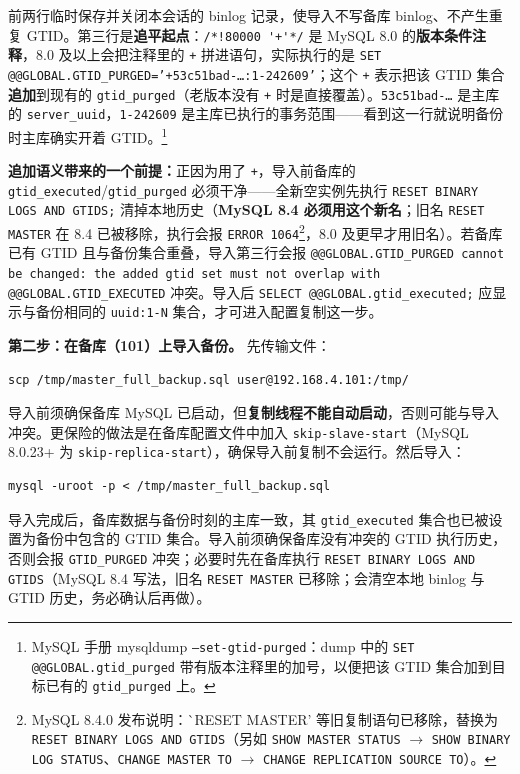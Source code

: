 \documentclass[12pt,UTF8]{ctexbook}
\begin{document}
前两行临时保存并关闭本会话的 binlog 记录，使导入不写备库 binlog、不产生重复 GTID。第三行是\textbf{追平起点}：\verb|/*!80000 '+'*/| 是 MySQL 8.0 的\textbf{版本条件注释}，8.0 及以上会把注释里的 \texttt{+} 拼进语句，实际执行的是 \texttt{SET @@GLOBAL.GTID\_PURGED='+53c51bad-\ldots:1-242609'}；这个 \texttt{+} 表示把该 GTID 集合\textbf{追加}到现有的 \texttt{gtid\_purged}（老版本没有 \texttt{+} 时是直接覆盖）。\texttt{53c51bad-\ldots} 是主库的 \texttt{server\_uuid}，\texttt{1-242609} 是主库已执行的事务范围——看到这一行就说明备份时主库确实开着 GTID。\footnote{MySQL 手册 mysqldump \texttt{--set-gtid-purged}：dump 中的 \texttt{SET @@GLOBAL.gtid\_purged} 带有版本注释里的加号，以便把该 GTID 集合加到目标已有的 \texttt{gtid\_purged} 上。}

\textbf{追加语义带来的一个前提：}正因为用了 \texttt{+}，导入前备库的 \texttt{gtid\_executed}/\texttt{gtid\_purged} 必须干净——全新空实例先执行 \texttt{RESET BINARY LOGS AND GTIDS;} 清掉本地历史（\textbf{MySQL 8.4 必须用这个新名}；旧名 \texttt{RESET MASTER} 在 8.4 已被移除，执行会报 \texttt{ERROR 1064}\footnote{MySQL 8.4.0 发布说明：\`{}RESET MASTER' 等旧复制语句已移除，替换为 \texttt{RESET BINARY LOGS AND GTIDS}（另如 \texttt{SHOW MASTER STATUS} $\to$ \texttt{SHOW BINARY LOG STATUS}、\texttt{CHANGE MASTER TO} $\to$ \texttt{CHANGE REPLICATION SOURCE TO}）。}，8.0 及更早才用旧名）。若备库已有 GTID 且与备份集合重叠，导入第三行会报 \texttt{@@GLOBAL.GTID\_PURGED cannot be changed: the added gtid set must not overlap with @@GLOBAL.GTID\_EXECUTED} 冲突。导入后 \texttt{SELECT @@GLOBAL.gtid\_executed;} 应显示与备份相同的 \texttt{uuid:1-N} 集合，才可进入配置复制这一步。

\textbf{第二步：在备库（101）上导入备份。} 先传输文件：

\begin{lstlisting}
scp /tmp/master_full_backup.sql user@192.168.4.101:/tmp/
\end{lstlisting}

导入前须确保备库 MySQL 已启动，但\textbf{复制线程不能自动启动}，否则可能与导入冲突。更保险的做法是在备库配置文件中加入 \texttt{skip-slave-start}（MySQL 8.0.23+ 为 \texttt{skip-replica-start}），确保导入前复制不会运行。然后导入：

\begin{lstlisting}
mysql -uroot -p < /tmp/master_full_backup.sql
\end{lstlisting}

导入完成后，备库数据与备份时刻的主库一致，其 \texttt{gtid\_executed} 集合也已被设置为备份中包含的 GTID 集合。导入前须确保备库没有冲突的 GTID 执行历史，否则会报 \texttt{GTID\_PURGED} 冲突；必要时先在备库执行 \texttt{RESET BINARY LOGS AND GTIDS}（MySQL 8.4 写法，旧名 \texttt{RESET MASTER} 已移除；会清空本地 binlog 与 GTID 历史，务必确认后再做）。
\end{document}
